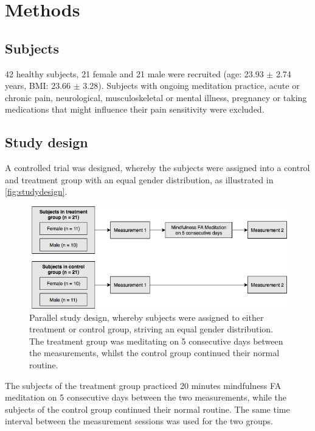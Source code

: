 \section{Methods}
\subsection{Subjects}
42 healthy subjects, 21 female and 21 male were recruited (age: 23.93 $\pm$ 2.74 years, BMI: 23.66 $\pm$ 3.28). Subjects with ongoing meditation practice, acute or chronic pain, neurological, musculoskeletal or mental illness, pregnancy or taking medications that might influence their pain sensitivity were excluded.

\subsection{Study design}
A controlled trial was designed, whereby the subjects were assigned into a control and treatment group with an equal gender distribution, as illustrated in \autoref{fig:studydesign}.

\begin{figure}[H]
\centering
\includegraphics[width=1\columnwidth]{../figures/studydesign.png}
\caption{Parallel study design, whereby subjects were assigned to either treatment or control group, striving an equal gender distribution. The treatment group was meditating on 5 consecutive days between the measurements, whilst the control group continued their normal routine.}
\label{fig:studydesign}
\end{figure} 

\noindent 
The subjects of the treatment group practiced 20 minutes mindfulness FA meditation on 5 consecutive days between the two measurements, while the subjects of the control group continued their normal routine. The same time interval between the measurement sessions was used for the two groups.

